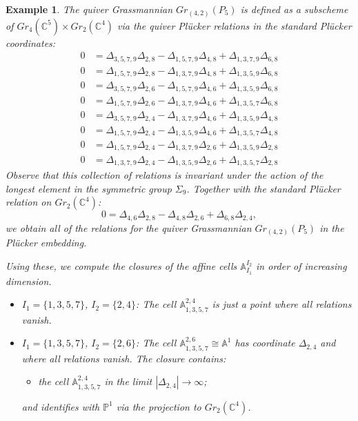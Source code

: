 \documentclass{amsart}
\newtheorem{example}[theorem]{Example}
\numberwithin{equation}{section}
\renewcommand{\AA}{\mathbb{A}}
\newcommand{\CC}{\mathbb{C}}
\newcommand{\PP}{\mathbb{P}}
\begin{document}
  \begin{example}
    The quiver Grassmannian $Gr_{(4,2)}(P_5)$ is defined as a subscheme of $Gr_4(\CC^5)\times Gr_2(\CC^4)$ via the quiver Pl\"ucker relations in the standard Pl\"ucker coordinates:
    \begin{align*}
      0 &= \Delta_{3,5,7,9} \Delta_{2,8} - \Delta_{1,5,7,9}\Delta_{4,8} + \Delta_{1,3,7,9}\Delta_{6,8}\\
      0 &= \Delta_{1,5,7,9}\Delta_{2,8} - \Delta_{1,3,7,9}\Delta_{4,8} + \Delta_{1,3,5,9}\Delta_{6,8}\\
      0 &= \Delta_{3,5,7,9} \Delta_{2,6} - \Delta_{1,5,7,9}\Delta_{4,6} + \Delta_{1,3,5,9}\Delta_{6,8}\\
      0 &= \Delta_{1,5,7,9}\Delta_{2,6} - \Delta_{1,3,7,9}\Delta_{4,6} + \Delta_{1,3,5,7}\Delta_{6,8}\\
      0 &= \Delta_{3,5,7,9} \Delta_{2,4} - \Delta_{1,3,7,9}\Delta_{4,6} + \Delta_{1,3,5,9}\Delta_{4,8}\\
      0 &= \Delta_{1,5,7,9}\Delta_{2,4} - \Delta_{1,3,5,9}\Delta_{4,6} + \Delta_{1,3,5,7}\Delta_{4,8}\\
      0 &= \Delta_{1,5,7,9}\Delta_{2,4} - \Delta_{1,3,7,9}\Delta_{2,6} + \Delta_{1,3,5,9}\Delta_{2,8}\\
      0 &= \Delta_{1,3,7,9}\Delta_{2,4} - \Delta_{1,3,5,9}\Delta_{2,6} + \Delta_{1,3,5,7}\Delta_{2,8}
    \end{align*}
    Observe that this collection of relations is invariant under the action of the longest element in the symmetric group $\Sigma_9$.
    Together with the standard Pl\"ucker relation on $Gr_2(\CC^4)$:
    \begin{equation*}
      0 = \Delta_{4,6}\Delta_{2,8} - \Delta_{4,8}\Delta_{2,6} + \Delta_{6,8}\Delta_{2,4},
    \end{equation*}
    we obtain all of the relations for the quiver Grassmannian $Gr_{(4,2)}(P_5)$ in the Pl\"ucker embedding.

    Using these, we compute the closures of the affine cells $\AA_{I_1}^{I_2}$ in order of increasing dimension.
    \begin{itemize}
      \item $I_1=\{1,3,5,7\}$, $I_2=\{2,4\}$: The cell $\AA_{1,3,5,7}^{2,4}$ is just a point where all relations vanish.

      \item $I_1=\{1,3,5,7\}$, $I_2=\{2,6\}$: The cell $\AA_{1,3,5,7}^{2,6} \cong \AA^1$ has coordinate $\Delta_{2,4}$ and where all relations vanish.
        The closure contains:
        \begin{itemize}
          \item the cell $\AA_{1,3,5,7}^{2,4}$ in the limit $|\Delta_{2,4}|\to\infty$;
        \end{itemize}
        and identifies with $\PP^1$ via the projection to $Gr_2(\CC^4)$.


\end{itemize}
\end{example}
\end{document}

